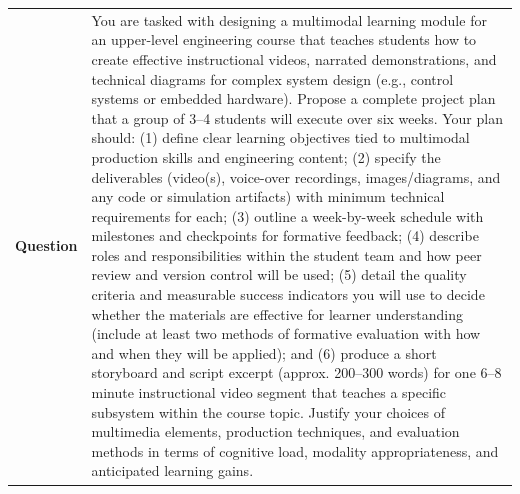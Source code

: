 \begin{longtable}{@{}l p{12.5cm}@{}}
  \textbf{Question} & You are tasked with designing a multimodal learning module for an upper-level engineering course that teaches students how to create effective instructional videos, narrated demonstrations, and technical diagrams for complex system design (e.g., control systems or embedded hardware). Propose a complete project plan that a group of 3--4 students will execute over six weeks. Your plan should: (1) define clear learning objectives tied to multimodal production skills and engineering content; (2) specify the deliverables (video(s), voice-over recordings, images/diagrams, and any code or simulation artifacts) with minimum technical requirements for each; (3) outline a week-by-week schedule with milestones and checkpoints for formative feedback; (4) describe roles and responsibilities within the student team and how peer review and version control will be used; (5) detail the quality criteria and measurable success indicators you will use to decide whether the materials are effective for learner understanding (include at least two methods of formative evaluation with how and when they will be applied); and (6) produce a short storyboard and script excerpt (approx. 200--300 words) for one 6--8 minute instructional video segment that teaches a specific subsystem within the course topic. Justify your choices of multimedia elements, production techniques, and evaluation methods in terms of cognitive load, modality appropriateness, and anticipated learning gains. \\

\end{longtable}
